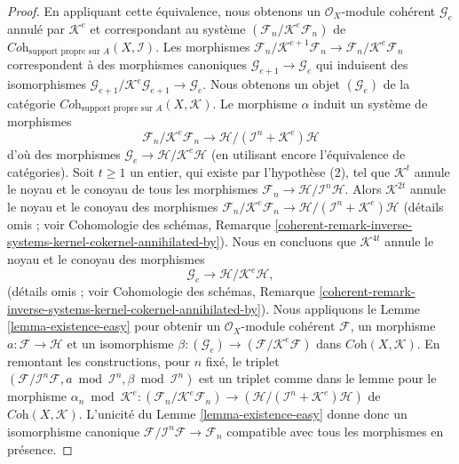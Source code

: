 \begin{proof}
\medskip\noindent
En appliquant cette équivalence, nous obtenons un $\mathcal{O}_X$-module cohérent
$\mathcal{G}_e$ annulé par $\mathcal{K}^e$ et correspondant au système
$(\mathcal{F}_n/\mathcal{K}^e\mathcal{F}_n)$ de
$\textit{Coh}_{\text{support propre sur } A}(X, \mathcal{I})$. Les morphismes
$\mathcal{F}_n/\mathcal{K}^{e + 1}\mathcal{F}_n \to
\mathcal{F}_n/\mathcal{K}^e\mathcal{F}_n$ correspondent à des morphismes canoniques
$\mathcal{G}_{e + 1} \to \mathcal{G}_e$ qui induisent des isomorphismes
$\mathcal{G}_{e + 1}/\mathcal{K}^e\mathcal{G}_{e + 1} \to \mathcal{G}_e$.
Nous obtenons un objet $(\mathcal{G}_e)$ de la catégorie
$\textit{Coh}_{\text{support propre sur } A}(X, \mathcal{K})$.
Le morphisme $\alpha$ induit un système de morphismes
$$
\mathcal{F}_n/\mathcal{K}^e\mathcal{F}_n
\longrightarrow
\mathcal{H}/(\mathcal{I}^n + \mathcal{K}^e)\mathcal{H}
$$
d'où des morphismes $\mathcal{G}_e \to \mathcal{H}/\mathcal{K}^e\mathcal{H}$
(en utilisant encore l'équivalence de catégories).
Soit $t \geq 1$ un entier, qui existe par l'hypothèse (2),
tel que $\mathcal{K}^t$ annule le noyau et le conoyau de tous les morphismes
$\mathcal{F}_n \to \mathcal{H}/\mathcal{I}^n\mathcal{H}$.
Alors $\mathcal{K}^{2t}$ annule le noyau et le conoyau des morphismes
$\mathcal{F}_n/\mathcal{K}^e\mathcal{F}_n \to
\mathcal{H}/(\mathcal{I}^n + \mathcal{K}^e)\mathcal{H}$
(détails omis ; voir Cohomologie des schémas,
Remarque \ref{coherent-remark-inverse-systems-kernel-cokernel-annihilated-by}).
Nous en concluons que $\mathcal{K}^{4t}$ annule le noyau et
le conoyau des morphismes
$$
\mathcal{G}_e
\longrightarrow
\mathcal{H}/\mathcal{K}^e\mathcal{H},
$$
(détails omis ; voir Cohomologie des schémas,
Remarque \ref{coherent-remark-inverse-systems-kernel-cokernel-annihilated-by}).
Nous appliquons le Lemme \ref{lemma-existence-easy} pour obtenir un
$\mathcal{O}_X$-module cohérent $\mathcal{F}$, un morphisme
$a : \mathcal{F} \to \mathcal{H}$ et un isomorphisme
$\beta : (\mathcal{G}_e) \to (\mathcal{F}/\mathcal{K}^e\mathcal{F})$
dans $\textit{Coh}(X, \mathcal{K})$. En remontant les constructions, pour $n$ fixé,
le triplet
$(\mathcal{F}/\mathcal{I}^n\mathcal{F}, a \bmod \mathcal{I}^n, \beta
\bmod \mathcal{I}^n)$ est un triplet comme dans le lemme pour le morphisme
$\alpha_n \bmod \mathcal{K}^e :
(\mathcal{F}_n/\mathcal{K}^e\mathcal{F}_n) \to
(\mathcal{H}/(\mathcal{I}^n + \mathcal{K}^e)\mathcal{H})$
de $\textit{Coh}(X, \mathcal{K})$. L'unicité du
Lemme \ref{lemma-existence-easy}
donne donc un isomorphisme canonique
$\mathcal{F}/\mathcal{I}^n\mathcal{F} \to \mathcal{F}_n$
compatible avec tous les morphismes en présence.


\end{proof}
